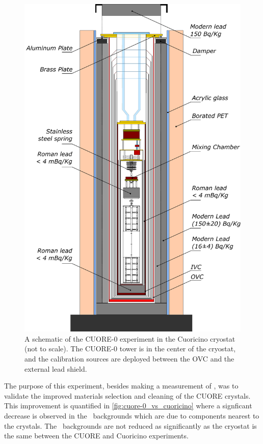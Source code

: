 \begin{figure} [htbp]
    \centering
    \includegraphics[width=0.8\linewidth]{Figures/CUORE-0_cryostat_schematic.pdf}
    \caption[A schematic of the CUORE-0 experiment.]
    {A schematic of the CUORE-0 experiment in the Cuoricino cryostat (not to scale).
    The CUORE-0 tower is in the center of the cryostat, and the calibration sources are deployed between the OVC and the external lead shield.}
    \label{fig:CUORE-0_cryostat_schematic}
\end{figure}

The purpose of this experiment, besides making a measurement of \zeronubb, was to validate the improved materials selection and cleaning of the CUORE crystals.
This improvement is quantified in \autoref{fig:cuore-0_vs_cuoricino} where a signficant decrease is observed in the \alpha~backgrounds which are due to components nearest to the crystals.
The \gamma~backgrounds are not reduced as significantly as the cryostat is the same between the CUORE and Cuoricino experiments.

